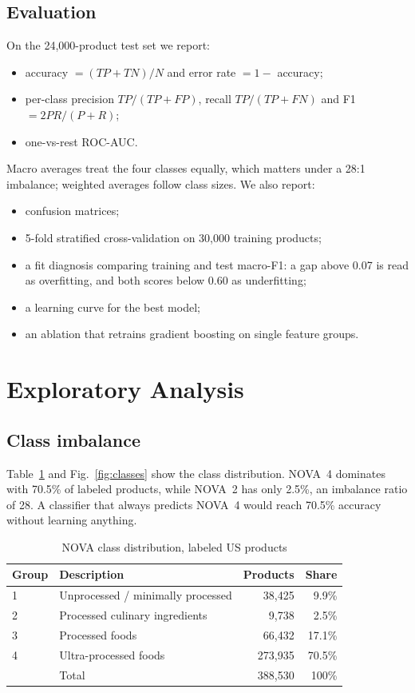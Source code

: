 \documentclass[conference]{IEEEtran}
\begin{document}
\subsection{Evaluation}
On the 24,000-product test set we report:
\begin{itemize}
    \item accuracy $= (TP+TN)/N$ and error rate $= 1 - $ accuracy;
    \item per-class precision $TP/(TP+FP)$, recall $TP/(TP+FN)$ and F1 $= 2PR/(P+R)$;
    \item one-vs-rest ROC-AUC.
\end{itemize}
Macro averages treat the four classes equally, which matters under a 28:1 imbalance; weighted averages follow class sizes. We also report:
\begin{itemize}
    \item confusion matrices;
    \item 5-fold stratified cross-validation on 30,000 training products;
    \item a fit diagnosis comparing training and test macro-F1: a gap above 0.07 is read as overfitting, and both scores below 0.60 as underfitting;
    \item a learning curve for the best model;
    \item an ablation that retrains gradient boosting on single feature groups.
\end{itemize}

\section{Exploratory Analysis}
\label{sec:eda}

\subsection{Class imbalance}
Table~\ref{tab:classes} and Fig.~\ref{fig:classes} show the class distribution. NOVA~4 dominates with 70.5\% of labeled products, while NOVA~2 has only 2.5\%, an imbalance ratio of 28. A classifier that always predicts NOVA~4 would reach 70.5\% accuracy without learning anything.

\begin{table}[t]
\centering
\caption{NOVA class distribution, labeled US products}
\label{tab:classes}
\begin{tabular}{llrr}
\toprule
Group & Description & Products & Share \\
\midrule
1 & Unprocessed / minimally processed & 38,425 & 9.9\% \\
2 & Processed culinary ingredients & 9,738 & 2.5\% \\
3 & Processed foods & 66,432 & 17.1\% \\
4 & Ultra-processed foods & 273,935 & 70.5\% \\
\midrule
 & Total & 388,530 & 100\% \\
\bottomrule
\end{tabular}
\end{table}
\end{document}
